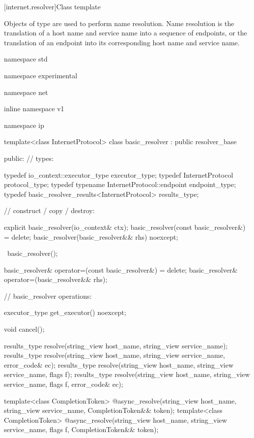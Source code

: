 %
[internet.resolver]{Class template }

\pnum
Objects of type  are used to perform name resolution. Name resolution is the translation of a host name and service name into a sequence of endpoints, or the translation of an endpoint into its corresponding host name and service name.

\begin{codeblock}
namespace std {
namespace experimental {
namespace net {
inline namespace v1 {
namespace ip {

  template<class InternetProtocol>
  class basic_resolver : public resolver_base
  {
  public:
    // types:

    typedef io_context::executor_type executor_type;
    typedef InternetProtocol protocol_type;
    typedef typename InternetProtocol::endpoint endpoint_type;
    typedef basic_resolver_results<InternetProtocol> results_type;

    // construct / copy / destroy:

    explicit basic_resolver(io_context& ctx);
    basic_resolver(const basic_resolver&) = delete;
    basic_resolver(basic_resolver&& rhs) noexcept;

    ~basic_resolver();

    basic_resolver& operator=(const basic_resolver&) = delete;
    basic_resolver& operator=(basic_resolver&& rhs);

    // basic_resolver operations:

    executor_type get_executor() noexcept;

    void cancel();

    results_type resolve(string_view host_name, string_view service_name);
    results_type resolve(string_view host_name, string_view service_name,
                         error_code& ec);
    results_type resolve(string_view host_name, string_view service_name,
                         flags f);
    results_type resolve(string_view host_name, string_view service_name,
                         flags f, error_code& ec);

    template<class CompletionToken>
      @\DEDUCED@ async_resolve(string_view host_name, string_view service_name,
                            CompletionToken&& token);
    template<class CompletionToken>
      @\DEDUCED@ async_resolve(string_view host_name, string_view service_name,
                            flags f, CompletionToken&& token);

}}}}}}
\end{codeblock}
